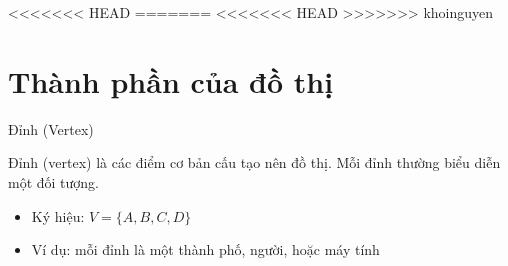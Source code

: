 <<<<<<< HEAD
=======
<<<<<<< HEAD
>>>>>>> khoinguyen
\section{Thành phần của đồ thị}

\begin{frame}{Đỉnh (Vertex)}
\begin{tcolorbox}[colback=blue!5,colframe=mainblue,title=Khái niệm]
Đỉnh (vertex) là các điểm cơ bản cấu tạo nên đồ thị.  
Mỗi đỉnh thường biểu diễn một đối tượng.
\end{tcolorbox}

\vspace{0.5cm}

\begin{itemize}
\item Ký hiệu: $V = \{A, B, C, D\}$
\item Ví dụ: mỗi đỉnh là một thành phố, người, hoặc máy tính
\end{itemize}

\vspace{0.5cm}

\centering
{}

\end{frame}

